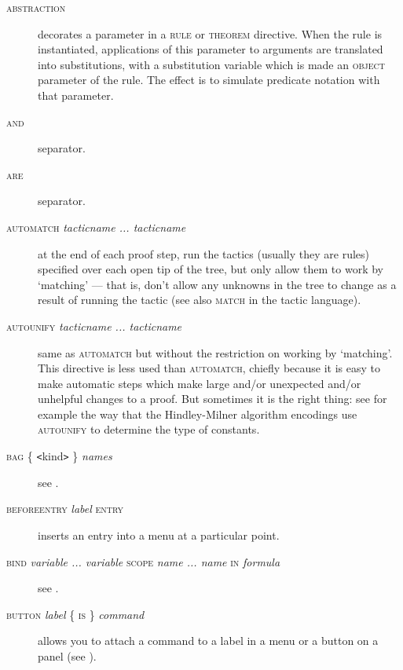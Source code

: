 \begin{description}
\item[\textsc{abstraction}] decorates a parameter in a \textsc{rule} or \textsc{theorem} directive. When the rule is instantiated, applications of this parameter to arguments are translated into substitutions, with a substitution variable which is made an \textsc{object} parameter of the rule. The effect is to simulate predicate notation with that parameter.

\item[\textsc{and}] separator.

\item[\textsc{are}] separator.

\item[\textsc{automatch} \textit{tacticname ... tacticname}] at the end of each proof step, run the tactics (usually they are rules) specified over each open tip of the tree, but only allow them to work by `matching' --- that is, don't allow any unknowns in the tree to change as a result of running the tactic (see also \textsc{match} in the tactic language).

\item[\textsc{autounify} \textit{tacticname ... tacticname}] same as \textsc{automatch} but without the restriction on working by `matching'. This directive is less used than \textsc{automatch}, chiefly because it is easy to make automatic steps which make large and/or unexpected and/or unhelpful changes to a proof. But sometimes it is the right thing: see for example the way that the Hindley-Milner algorithm encodings use \textsc{autounify} to determine the type of constants.

\item[\textsc{bag \{} \texttt{<}kind\texttt{>} \textsc{\}} \textit{names}] see .

\item[\textsc{beforeentry} \textit{label} \textsc{entry}] inserts an entry into a menu at a particular point.

\item[\textsc{bind} \textit{variable ... variable} \textsc{scope} \textit{name ... name} \textsc{in} \textit{formula}] see .

\item[\textsc{button} \textit{label} \{ \textsc{is} \} \textit{command}] allows you to attach a command to a label in a menu or a button on a panel (see ).


\end{description}
